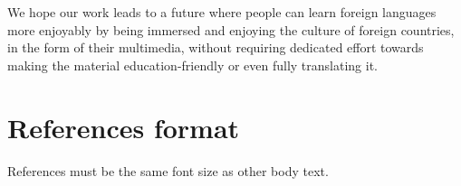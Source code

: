 \documentclass{sigchi}
\begin{document}
We hope our work leads to a future where people can learn foreign languages more enjoyably by being immersed and enjoying the culture of foreign countries, in the form of their multimedia, without requiring dedicated effort towards making the material education-friendly or even fully translating it.

\balance

\section{References format}
References must be the same font size as other body text.



\end{document}
